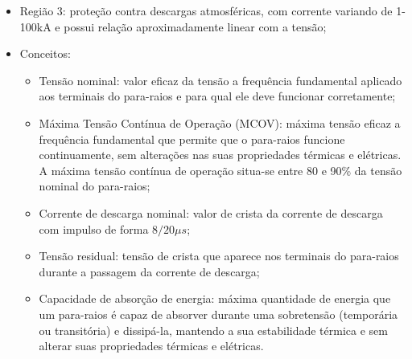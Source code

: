 \begin{itemize}
\begin{itemize}
        \item Região 3: proteção contra descargas atmosféricas, com corrente variando de 1-100kA e possui relação aproximadamente linear com a tensão;
        \item Conceitos:
        \begin{itemize}
            \item Tensão nominal: valor eficaz da tensão a frequência fundamental aplicado aos terminais do para-raios e para qual ele deve funcionar corretamente;
            \item Máxima Tensão Contínua de Operação (MCOV): máxima tensão eficaz a frequência fundamental que permite que o para-raios funcione continuamente, sem alterações nas suas propriedades térmicas e elétricas. A máxima tensão contínua de operação situa-se entre 80 e 90\% da tensão nominal do para-raios;
            \item Corrente de descarga nominal: valor de crista da corrente de descarga com impulso de forma $8/20 \mu s$;
            \item Tensão residual: tensão de crista que aparece nos terminais do para-raios durante a passagem da corrente de descarga;
            \item Capacidade de absorção de energia:  máxima quantidade de energia que um para-raios é capaz de absorver durante uma sobretensão (temporária ou transitória) e dissipá-la, mantendo a sua estabilidade térmica e sem alterar suas propriedades térmicas e elétricas.
        \end{itemize}
    \end{itemize}
\end{itemize}